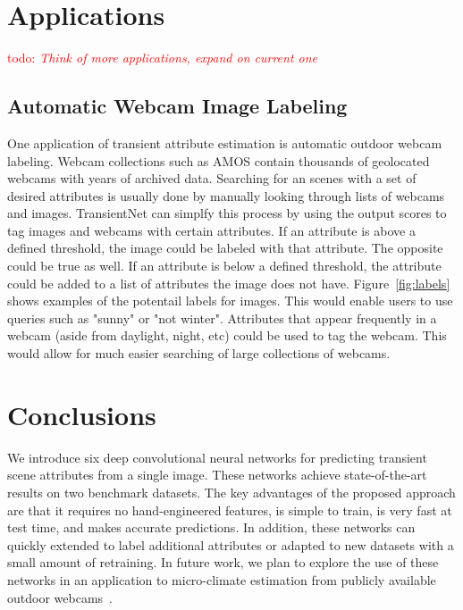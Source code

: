 \documentclass{article}
\newcommand{\todo}[1]{\textcolor{red}{todo: {\em #1}}}
\newcommand{\figref}[1]{Figure~\ref{fig:#1}}
\begin{document}
\section{Applications}
\todo{Think of more applications, expand on current one}
\subsection{Automatic Webcam Image Labeling}
\indent

One application of transient attribute estimation is automatic outdoor
webcam labeling. Webcam collections such as AMOS\cite{jacobs07amos} contain
thousands of geolocated webcams with years of archived data.  Searching
for an scenes with a set of desired attributes is usually done by manually
looking through lists of webcams and images.  TransientNet can simplfy this
process by using the output scores to tag images and webcams with certain 
attributes.  If an attribute is above a defined threshold, the image could 
be labeled with that attribute.  The opposite could be true as well.  If an
attribute is below a defined threshold, the attribute could be added to a 
list of attributes the image does not have.  \figref{labels} shows examples of
the potentail labels for images. This would enable users to use queries such 
as "sunny" or "not winter".  Attributes that appear frequently in a webcam 
(aside from daylight, night, etc) could be used to tag the webcam.  This would 
allow for much easier searching of large collections of webcams.


\section{Conclusions}

We introduce six deep convolutional neural networks for predicting
transient scene attributes from a single image. These networks achieve
state-of-the-art results on two benchmark datasets. The key advantages
of the proposed approach are that it requires no hand-engineered
features, is simple to train, is very fast at test time, and makes
accurate predictions. In addition, these networks can quickly extended
to label additional attributes or adapted to new datasets with a small
amount of retraining. In future work, we plan to explore the use of
these networks in an application to micro-climate estimation from
publicly available outdoor webcams~\cite{islam13webcamweather}. 



\end{document}
